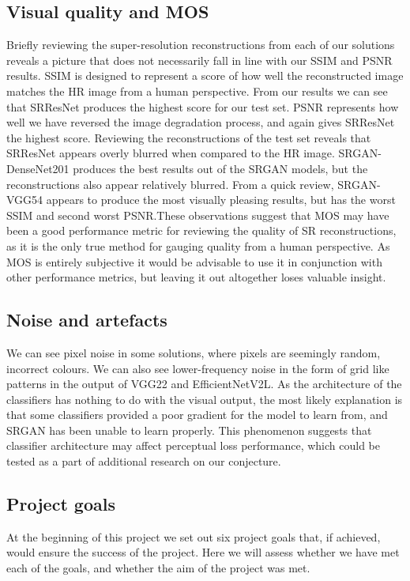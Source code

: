 \subsection{Visual quality and MOS}
Briefly reviewing the super-resolution reconstructions from each of our solutions reveals a picture that does not necessarily fall in line with our SSIM and PSNR results. SSIM is designed to represent a score of how well the reconstructed image matches the HR image from a human perspective. From our results we can see that SRResNet produces the highest score for our test set. PSNR represents how well we have reversed the image degradation process, and again gives SRResNet the highest score. Reviewing the reconstructions of the test set reveals that SRResNet appears overly blurred when compared to the HR image. SRGAN-DenseNet201 produces the best results out of the SRGAN models, but the reconstructions also appear relatively blurred. From a quick review, SRGAN-VGG54 appears to produce the most visually pleasing results, but has the worst SSIM and second worst PSNR.\@ These observations suggest that MOS may have been a good performance metric for reviewing the quality of SR reconstructions, as it is the only true method for gauging quality from a human perspective. As MOS is entirely subjective it would be advisable to use it in conjunction with other performance metrics, but leaving it out altogether loses valuable insight.

\subsection{Noise and artefacts}
We can see pixel noise in some solutions, where pixels are seemingly random, incorrect colours. We can also see lower-frequency noise in the form of grid like patterns in the output of VGG22 and EfficientNetV2L. As the architecture of the classifiers has nothing to do with the visual output, the most likely explanation is that some classifiers provided a poor gradient for the model to learn from, and SRGAN has been unable to learn properly. This phenomenon suggests that classifier architecture may affect perceptual loss performance, which could be tested as a part of additional research on our conjecture.

\subsection{Project goals}
At the beginning of this project we set out six project goals that, if achieved, would ensure the success of the project. Here we will assess whether we have met each of the goals, and whether the aim of the project was met.

